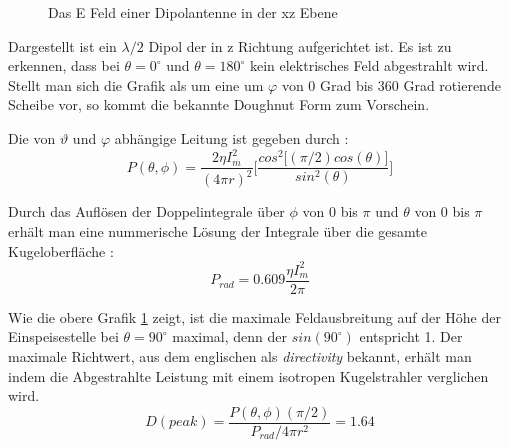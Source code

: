 \begin{figure}
\begin{center}
\end{center}
	\caption{Das E Feld einer Dipolantenne in der xz Ebene}
	\label{fig:DipolEFerd}
\end{figure}



Dargestellt ist ein $\lambda/2$ Dipol der in z Richtung aufgerichtet ist. Es ist zu erkennen, dass bei $\theta = 0 ^\circ $  und $\theta = 180 ^\circ $ kein elektrisches Feld abgestrahlt wird. Stellt man sich die Grafik als um eine um $\varphi$ von 0 Grad bis 360 Grad rotierende Scheibe vor, so kommt die bekannte Doughnut Form zum Vorschein.

Die von $\vartheta$ und $\varphi$ abhängige Leitung ist gegeben durch \cite{elliott1981antenna}:
\begin{equation}
P(\theta,\phi)=\frac{2\eta I_{m}^{2}}{(4\pi r)^{2}}\lbrack \frac{cos^{2}\lbrack (\pi/2) cos(\theta)\rbrack}{sin^{2}(\theta)}\rbrack
\end{equation}

Durch das Auflösen der Doppelintegrale über $\phi$ von 0 bis $\pi$  und $\theta$ von 0 bis $\pi$ erhält man eine nummerische Lösung der Integrale über die gesamte Kugeloberfläche \cite{elliott1981antenna}:
\begin{equation}
P_{rad}=0.609 \frac{\eta I_{m}^{2}}{2\pi}
\end{equation}

Wie die obere Grafik \ref{fig:DipolEFerd} zeigt, ist die maximale Feldausbreitung auf der Höhe der Einspeisestelle bei $\theta = 90 ^\circ $ maximal,  denn der  $sin(90 ^\circ ) $ entspricht 1.
Der maximale Richtwert,  aus dem englischen als \textit{directivity} bekannt, erhält man indem die Abgestrahlte Leistung mit einem isotropen Kugelstrahler verglichen wird\cite{elliott1981antenna}.
\begin{equation}
D(peak)=\frac{P(\theta,\phi)(\pi/2)}{P_{rad}/ 4 \pi r^{2}} =1.64
\label{eq:Directivity}
\end{equation}

